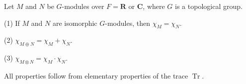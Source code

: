 Let $M$ and $N$ be $G$-modules over $F = \mathbf{R}$ or $\mathbf{C}$, where $G$ is a topological group.

(1) If $M$ and $N$ are isomorphic $G$-modules, then $\chi_M = \chi_N$.

(2) $\chi_{M \oplus N} = \chi_M + \chi_N$.

(3) $\chi_{M \otimes N} = \chi_M \cdot \chi_N$.

All properties follow from elementary properties of the trace $\operatorname{Tr}$.

